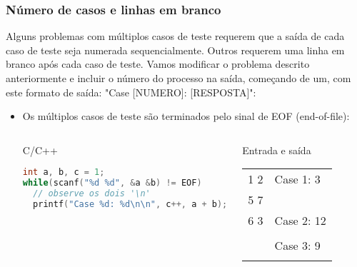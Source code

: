 \begin{frame} [fragile]
  \frametitle{Número de casos e linhas em branco}
  {\small Alguns problemas com múltiplos casos de teste requerem que a saída de cada caso de teste seja numerada sequencialmente. Outros requerem uma linha em branco após cada caso de teste. Vamos modificar o problema descrito anteriormente e incluir o número do processo na saída, começando de um, com este formato de saída: "Case [NUMERO]: [RESPOSTA]":}
    \begin{itemize}
      \item {\small Os múltiplos casos de teste são terminados pelo sinal de EOF (end-of-file):}
      \begin{columns}
      \begin{block:ie}{C/C++}
	\begin{lstlisting}[language=c]
int a, b, c = 1;
while(scanf("%d %d", &a &b) != EOF)
  // observe os dois '\n'
  printf("Case %d: %d\n\n", c++, a + b);
	\end{lstlisting}
      \end{block:ie}

      \begin{block:ie}{Entrada e saída}  \tiny
	\begin{tabularx}{\textwidth}{|X|X|}
	  1 2&Case 1: 3\\5 7&\\6 3&Case 2: 12\\&\\&Case 3: 9\\&
	\end{tabularx}
      \end{block:ie}
    \end{columns}
  \end{itemize}
\end{frame}

